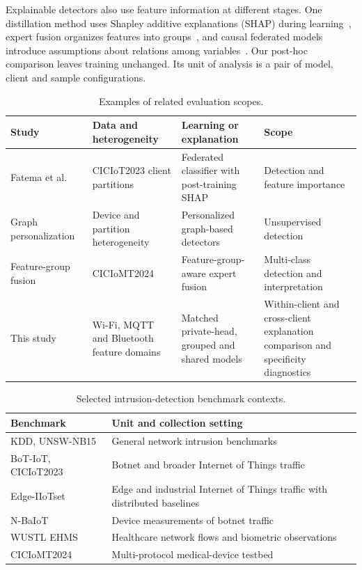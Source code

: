 \documentclass[nolineno]{ieeeaccess}
\begin{document}
Explainable detectors also use feature information at different stages. One distillation method uses Shapley additive explanations (SHAP) during learning~\cite{distill}, expert fusion organizes features into groups~\cite{experts}, and causal federated models introduce assumptions about relations among variables~\cite{causalfl}. Our post-hoc comparison leaves training unchanged. Its unit of analysis is a pair of model, client and sample configurations.

\begin{table}[t]\caption{Examples of related evaluation scopes.}\label{tab:related}\centering
\begin{tabular}{p{}p{}p{}p{}}
\hline
Study & Data and heterogeneity & Learning or explanation & Scope\\\hline
Fatema et al.~\cite{fedxai} & CICIoT2023 client partitions & Federated classifier with post-training SHAP & Detection and feature importance\\
Graph personalization~\cite{graph} & Device and partition heterogeneity & Personalized graph-based detectors & Unsupervised detection\\
Feature-group fusion~\cite{experts} & CICIoMT2024 & Feature-group-aware expert fusion & Multi-class detection and interpretation\\
This study & Wi-Fi, MQTT and Bluetooth feature domains & Matched private-head, grouped and shared models & Within-client and cross-client explanation comparison and specificity diagnostics\\
\hline
\end{tabular}\end{table}

\begin{table}[t]\caption{Selected intrusion-detection benchmark contexts.}\label{tab:datasets}\centering
\begin{tabular}{p{}p{}}\hline
Benchmark & Unit and collection setting\\\hline
KDD, UNSW-NB15~\cite{tavallaee2009detailed,moustafa2015unsw} & General network intrusion benchmarks\\
BoT-IoT, CICIoT2023~\cite{koroniotis2019towards,neto2023ciciot2023} & Botnet and broader Internet of Things traffic\\
Edge-IIoTset~\cite{edgeiio} & Edge and industrial Internet of Things traffic with distributed baselines\\
N-BaIoT~\cite{nbaiot} & Device measurements of botnet traffic\\
WUSTL EHMS~\cite{wustlehms} & Healthcare network flows and biometric observations\\
CICIoMT2024~\cite{dadkhah2024towards} & Multi-protocol medical-device testbed\\
\hline\end{tabular}\end{table}
\end{document}
